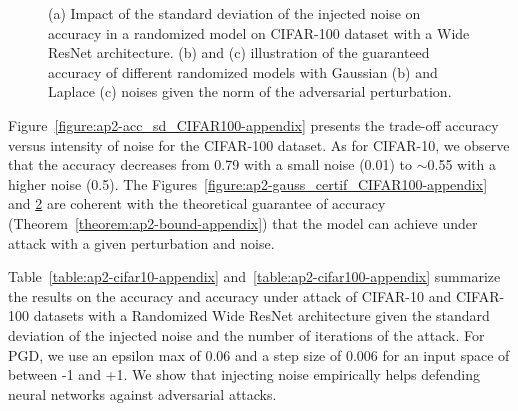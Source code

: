 \begin{figure}[htb]
\begin{subfigure}[t]{0.31\textwidth}
    \caption{}
    \label{figure:ap2-laplace_certif_CIFAR100-appendix}
  \end{subfigure}
  \caption{(a) Impact of the standard deviation of the injected noise on accuracy in a randomized model on CIFAR-100 dataset with a Wide ResNet architecture. (b) and (c) illustration of the guaranteed accuracy of different randomized models with Gaussian (b) and Laplace (c) noises given the norm of the adversarial perturbation.}
\end{figure}

Figure~\ref{figure:ap2-acc_sd_CIFAR100-appendix} presents the trade-off accuracy versus intensity of noise for the CIFAR-100 dataset. As for CIFAR-10, we observe that the accuracy decreases from 0.79 with a small noise (0.01) to $\sim$0.55 with a higher noise (0.5). The Figures~\ref{figure:ap2-gauss_certif_CIFAR100-appendix} and \ref{figure:ap2-laplace_certif_CIFAR100-appendix} are coherent with the theoretical guarantee of accuracy (Theorem~\ref{theorem:ap2-bound-appendix}) that the model can achieve under attack with a given perturbation and noise.   


Table~\ref{table:ap2-cifar10-appendix} and~\ref{table:ap2-cifar100-appendix} summarize the results on the accuracy and accuracy under attack of CIFAR-10 and CIFAR-100 datasets with a Randomized Wide ResNet architecture given the standard deviation of the injected noise and the number of iterations of the attack. For PGD, we use an epsilon max of 0.06 and a step size of 0.006 for an input space of between -1 and +1. We show that injecting noise empirically helps defending neural networks against adversarial attacks.


